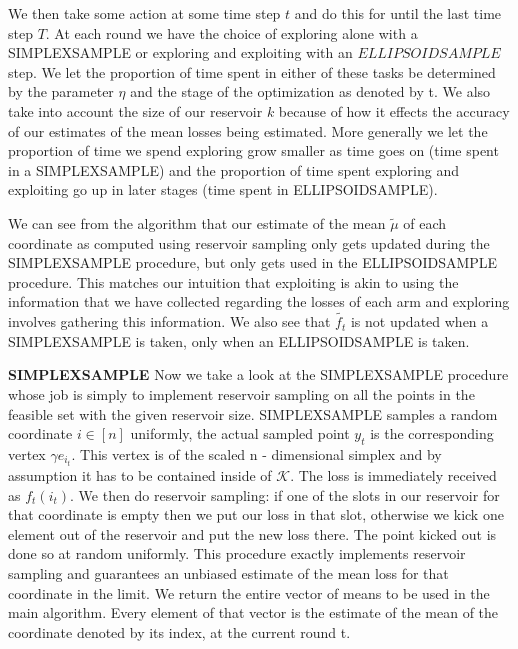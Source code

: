 We then take some action at some time step $t$ and do this for until the last time step $T$. At each round we have the choice of exploring alone with a SIMPLEXSAMPLE or exploring and exploiting with an $ELLIPSOIDSAMPLE$ step. We let the proportion of time spent in either of these tasks  be determined by the parameter $\eta$ and the stage of the optimization as denoted by t. We also take into account the size of our reservoir $k$ because of how it effects the accuracy of our estimates of the mean losses being estimated. More generally we let the proportion of time we spend exploring grow smaller as time goes on (time spent in a SIMPLEXSAMPLE) and the proportion of time spent exploring and exploiting go up in 
later stages (time spent in ELLIPSOIDSAMPLE).


We can see from the algorithm that our estimate of the mean $\tilde{\mu}$ of each coordinate as computed using reservoir sampling only gets updated during the SIMPLEXSAMPLE procedure, but only gets used in the ELLIPSOIDSAMPLE procedure. This matches our intuition that exploiting is akin to using the information that we have collected regarding the losses of each arm and exploring involves gathering this information. We also see that $\tilde{f_t}$ is not updated when a SIMPLEXSAMPLE is taken, only when an ELLIPSOIDSAMPLE is taken. 


\textbf{SIMPLEXSAMPLE}
Now we take a look at the SIMPLEXSAMPLE procedure whose job is simply to implement reservoir sampling on all the points in the feasible set with the given reservoir size. SIMPLEXSAMPLE samples a random coordinate $i \in [n]$ uniformly, the actual sampled point  $y_t$ is the corresponding vertex $\gamma e_{i_t}$. This vertex is of the scaled n - dimensional simplex and by assumption it has to be contained inside of $\mathcal{K}$. The loss is immediately received as $f_t(i_t)$. We then do reservoir sampling: if one of the slots in our reservoir for that coordinate is empty then we put our loss in that slot, otherwise we kick one element out of the reservoir and put the new loss there. The point kicked out is done so at random uniformly. This procedure exactly implements reservoir sampling and guarantees an unbiased estimate of the mean loss for that coordinate in the limit. We return the entire vector of means to be used in the main algorithm. Every element of that vector is the estimate of the mean of the coordinate denoted by its index, at the current round t.
 
